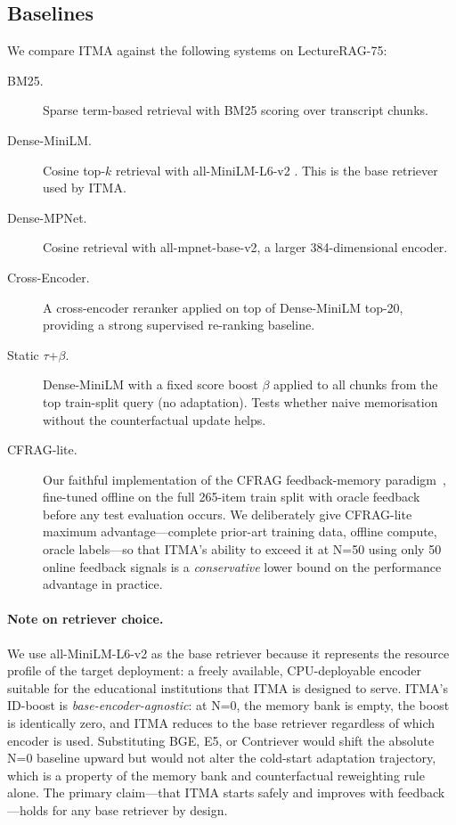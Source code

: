 \documentclass[preprint,12pt]{elsarticle}
\begin{document}
\subsection{Baselines}
We compare ITMA against the following systems on LectureRAG-75:
\begin{description}
\item[BM25.] Sparse term-based retrieval with BM25 scoring
      \citep{robertson2009bm25} over transcript chunks.
\item[Dense-MiniLM.] Cosine top-$k$ retrieval with all-MiniLM-L6-v2
      \citep{wang2020minilm}.  This is the base retriever used by ITMA.
\item[Dense-MPNet.] Cosine retrieval with all-mpnet-base-v2, a larger
      384-dimensional encoder.
\item[Cross-Encoder.] A cross-encoder reranker applied on top of
      Dense-MiniLM top-20, providing a strong supervised re-ranking baseline.
\item[Static $\tau$+$\beta$.] Dense-MiniLM with a fixed score boost $\beta$
      applied to all chunks from the top train-split query (no adaptation).
      Tests whether naive memorisation without the counterfactual update
      helps.
\item[CFRAG-lite.] Our faithful implementation of the CFRAG feedback-memory
      paradigm~\citep{cfrag2025}, fine-tuned offline on the full 265-item train
      split with oracle feedback before any test evaluation occurs.  We
      deliberately give CFRAG-lite maximum advantage---complete prior-art
      training data, offline compute, oracle labels---so that ITMA's ability to
      exceed it at N=50 using only 50 online feedback signals is a
      \emph{conservative} lower bound on the performance advantage in practice.
\end{description}

\paragraph{Note on retriever choice.}
We use all-MiniLM-L6-v2 as the base retriever because it represents the
resource profile of the target deployment: a freely available, CPU-deployable
encoder suitable for the educational institutions that ITMA is designed to
serve.  ITMA's ID-boost is \emph{base-encoder-agnostic}: at N=0, the memory
bank is empty, the boost is identically zero, and ITMA reduces to the base
retriever regardless of which encoder is used.  Substituting BGE, E5, or
Contriever would shift the absolute N=0 baseline upward but would not alter the
cold-start adaptation trajectory, which is a property of the memory bank and
counterfactual reweighting rule alone.  The primary claim---that ITMA starts
safely and improves with feedback---holds for any base retriever by design.
\end{document}

